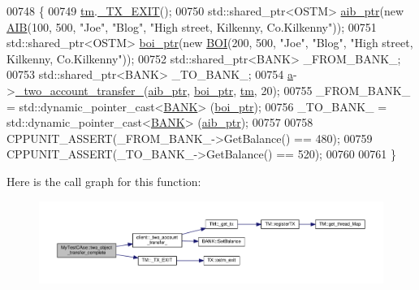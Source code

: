 \begin{DoxyCode}
00748                                              \{
00749     \hyperlink{class_my_test_c_ase_a422e6e5d4ddedea384be96031c89b72b_a422e6e5d4ddedea384be96031c89b72b}{tm}.\hyperlink{class_t_m_a5e2d1127f2429f2f524d25f430eade06_a5e2d1127f2429f2f524d25f430eade06}{\_TX\_EXIT}();
00750     std::shared\_ptr<OSTM> \hyperlink{class_my_test_c_ase_adad50e8278b64aa0321000b528e5362c_adad50e8278b64aa0321000b528e5362c}{aib\_ptr}(\textcolor{keyword}{new} \hyperlink{class_a_i_b}{AIB}(100, 500, \textcolor{stringliteral}{"Joe"}, \textcolor{stringliteral}{"Blog"}, \textcolor{stringliteral}{"High street, Kilkenny,
       Co.Kilkenny"}));
00751     std::shared\_ptr<OSTM> \hyperlink{class_my_test_c_ase_a5554de9e3e6393a89c66c036c529720b_a5554de9e3e6393a89c66c036c529720b}{boi\_ptr}(\textcolor{keyword}{new} \hyperlink{class_b_o_i}{BOI}(200, 500, \textcolor{stringliteral}{"Joe"}, \textcolor{stringliteral}{"Blog"}, \textcolor{stringliteral}{"High street, Kilkenny,
       Co.Kilkenny"}));
00752     std::shared\_ptr<BANK> \_FROM\_BANK\_;
00753     std::shared\_ptr<BANK> \_TO\_BANK\_;
00754     \hyperlink{class_my_test_c_ase_a08f3a55850ffce171406f81f2f6c9c74_a08f3a55850ffce171406f81f2f6c9c74}{a}->\hyperlink{classclient_a71edd1265ba9ae03f71b5dbf54548696_a71edd1265ba9ae03f71b5dbf54548696}{\_two\_account\_transfer\_}(\hyperlink{class_my_test_c_ase_adad50e8278b64aa0321000b528e5362c_adad50e8278b64aa0321000b528e5362c}{aib\_ptr}, \hyperlink{class_my_test_c_ase_a5554de9e3e6393a89c66c036c529720b_a5554de9e3e6393a89c66c036c529720b}{boi\_ptr}, 
      \hyperlink{class_my_test_c_ase_a422e6e5d4ddedea384be96031c89b72b_a422e6e5d4ddedea384be96031c89b72b}{tm}, 20);
00755     \_FROM\_BANK\_ = std::dynamic\_pointer\_cast<\hyperlink{class_b_a_n_k}{BANK}> (\hyperlink{class_my_test_c_ase_a5554de9e3e6393a89c66c036c529720b_a5554de9e3e6393a89c66c036c529720b}{boi\_ptr});
00756     \_TO\_BANK\_ = std::dynamic\_pointer\_cast<\hyperlink{class_b_a_n_k}{BANK}> (\hyperlink{class_my_test_c_ase_adad50e8278b64aa0321000b528e5362c_adad50e8278b64aa0321000b528e5362c}{aib\_ptr});
00757     
00758     CPPUNIT\_ASSERT(\_FROM\_BANK\_->GetBalance() == 480);
00759     CPPUNIT\_ASSERT(\_TO\_BANK\_->GetBalance() == 520);
00760     
00761 \}
\end{DoxyCode}


Here is the call graph for this function\+:
\nopagebreak
\begin{figure}[H]
\begin{center}
\leavevmode
\includegraphics[width=350pt]{class_my_test_c_ase_a6399ca8bca3f10a0f114a070d3e3a570_a6399ca8bca3f10a0f114a070d3e3a570_cgraph}
\end{center}
\end{figure}


